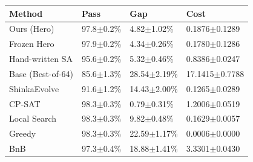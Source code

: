 \begin{tabular}{llll}
\toprule
Method & Pass & Gap & Cost \\
\midrule
Ours (Hero) & 97.8$\pm$0.2\% & 4.82$\pm$1.02\% & 0.1876$\pm$0.1289 \\
Frozen Hero & 97.9$\pm$0.2\% & 4.34$\pm$0.26\% & 0.1780$\pm$0.1286 \\
Hand-written SA & 95.6$\pm$0.2\% & 5.32$\pm$0.46\% & 0.8386$\pm$0.0247 \\
Base (Best-of-64) & 85.6$\pm$1.3\% & 28.54$\pm$2.19\% & 17.1415$\pm$0.7788 \\
ShinkaEvolve & 91.6$\pm$1.2\% & 14.43$\pm$2.00\% & 0.1265$\pm$0.0289 \\
CP-SAT & 98.3$\pm$0.3\% & 0.79$\pm$0.31\% & 1.2006$\pm$0.0519 \\
Local Search & 98.3$\pm$0.3\% & 9.82$\pm$0.48\% & 0.1629$\pm$0.0057 \\
Greedy & 98.3$\pm$0.3\% & 22.59$\pm$1.17\% & 0.0006$\pm$0.0000 \\
BnB & 97.3$\pm$0.4\% & 18.88$\pm$1.41\% & 3.3301$\pm$0.0430 \\
\bottomrule
\end{tabular}
